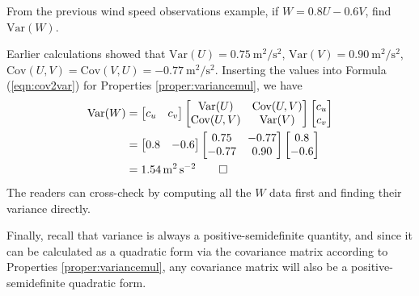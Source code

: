 \begin{exmp}
From the previous wind speed observations example, if $W = 0.8U-0.6V$, find $\text{Var}(W)$.
\end{exmp}
\begin{solution}
Earlier calculations showed that $\text{Var}(U) = \SI{0.75}{\square\m \per \square\s}$,
$\text{Var}(V) = \SI{0.90}{\square\m \per \square\s}$, $\text{Cov}(U,V) = \text{Cov}(V,U) = \SI{-0.77}{\square\m \per \square\s}$. Inserting the values into Formula  (\ref{eqn:cov2var}) for Properties \ref{proper:variancemul}, we have
\begin{align*}
\text{Var}(W) &=
\begin{bmatrix}
c_u & c_v
\end{bmatrix}
\begin{bmatrix}
\text{Var}(U) & \text{Cov}(U,V) \\
\text{Cov}(U,V) & \text{Var}(V)
\end{bmatrix}
\begin{bmatrix}
c_u \\
c_v
\end{bmatrix} \\
&=
\begin{bmatrix}
0.8 & -0.6
\end{bmatrix}
\begin{bmatrix}
0.75 & -0.77 \\
-0.77 & 0.90
\end{bmatrix}
\begin{bmatrix}
0.8 \\
-0.6
\end{bmatrix} \\
&= \SI{1.54}{\square\m \per \square\s} \qedhere
\end{align*} 
The readers can cross-check by computing all the $W$ data first and finding their variance directly.
\end{solution}
Finally, recall that variance is always a positive-semidefinite quantity, and since it can be calculated as a quadratic form via the covariance matrix according to Properties \ref{proper:variancemul}, any covariance matrix will also be a positive-semidefinite quadratic form.

